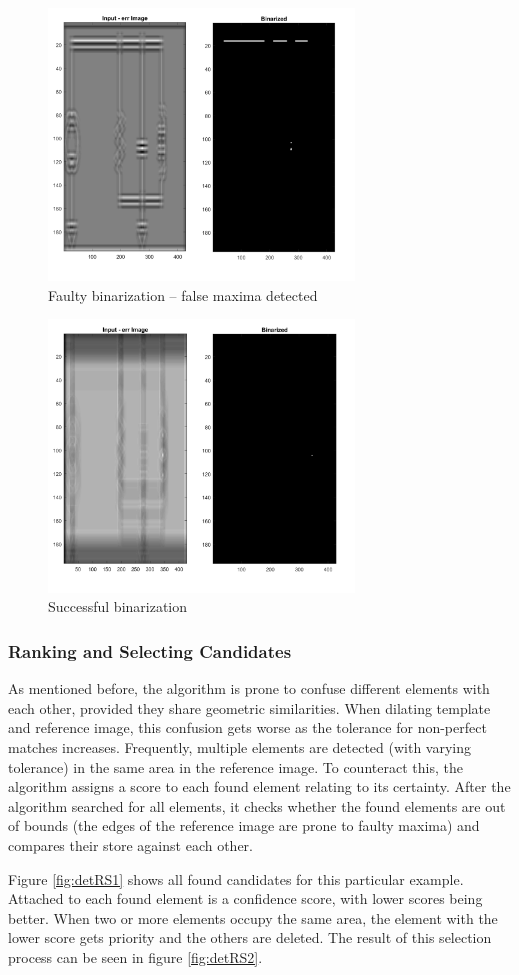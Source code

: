 \documentclass[10pt,twocolumn,letterpaper]{article}
\begin{document}
\begin{figure}[!ht]
\includegraphics[width = 3.2in]{img/detMX2.png}
\caption{Faulty binarization – false maxima detected}
\label{fig:detMX2}
\end{figure}
\par

\begin{figure}[!ht]
\includegraphics[width = 3.2in]{img/detMX3.png}
\caption{Successful binarization}
\label{fig:detMX3}
\end{figure}

\subsubsection*{Ranking and Selecting Candidates}

As mentioned before, the algorithm is prone to confuse different elements with each other, provided they share geometric similarities. When dilating template and reference image, this confusion gets worse as the tolerance for non-perfect matches increases. Frequently, multiple elements are detected (with varying tolerance) in the same area in the reference image. To counteract this, the algorithm assigns a score to each found element relating to its certainty. After the algorithm searched for all elements, it checks whether the found elements are out of bounds (the edges of the reference image are prone to faulty maxima) and compares their store against each other. 
\par
Figure \ref{fig:detRS1} shows all found candidates for this particular example. Attached to each found element is a confidence score, with lower scores being better. When two or more elements occupy the same area, the element with the lower score gets priority and the others are deleted. The result of this selection process can be seen in figure \ref{fig:detRS2}.
\end{document}
